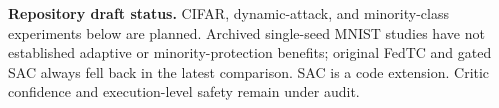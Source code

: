 \begingroup
\small
\noindent\textbf{Repository draft status.}
CIFAR, dynamic-attack, and minority-class experiments below are planned.
Archived single-seed MNIST studies have not established adaptive or minority-protection
benefits; original FedTC and gated SAC always fell back in the latest comparison.
SAC is a code extension. Critic confidence and execution-level safety remain under audit.
\par
\endgroup
